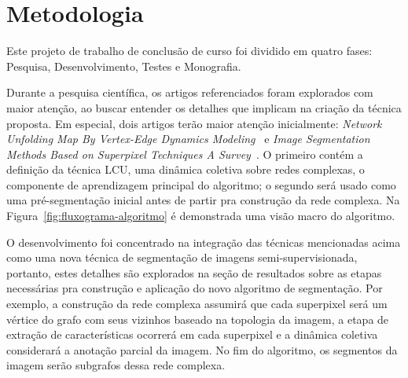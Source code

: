\chapter{Metodologia}\label{cap:metodologia}


Este projeto de trabalho de conclusão de curso foi dividido em quatro fases:
Pesquisa, Desenvolvimento, Testes e Monografia.

Durante a pesquisa científica, os artigos referenciados foram explorados com
maior atenção, ao buscar entender os detalhes que implicam
na criação da técnica proposta. Em especial, dois artigos terão maior
atenção inicialmente: \textit{Network Unfolding Map By Vertex-Edge
  Dynamics Modeling}~\cite{VerriNetworkUnfoldingMap2018} e
\textit{Image Segmentation Methods Based on Superpixel Techniques A
  Survey}~\cite{SuperpixelSurvey2020}. O primeiro contém a definição
da técnica LCU, uma dinâmica coletiva sobre redes complexas, o
componente de aprendizagem principal do algoritmo; o segundo será
usado como uma pré-segmentação inicial antes de partir pra construção
da rede complexa. Na Figura~\ref{fig:fluxograma-algoritmo} é demonstrada uma
visão macro do algoritmo.

\begin{figure}[!h]
        \captionsetup{width=8cm}
		\centering
\end{figure}


O desenvolvimento foi concentrado na integração das técnicas
mencionadas acima como uma nova técnica de segmentação de imagens
semi-supervisionada, portanto, estes detalhes são explorados na seção
de resultados sobre as etapas necessárias pra construção e aplicação
do novo algoritmo de segmentação. Por exemplo, a construção da rede
complexa assumirá que cada superpixel será um vértice do grafo com
seus vizinhos baseado na topologia da imagem, a etapa de extração de
características ocorrerá em cada superpixel e a dinâmica coletiva
considerará a anotação parcial da imagem. No fim do algoritmo, os
segmentos da imagem serão subgrafos dessa rede complexa.


